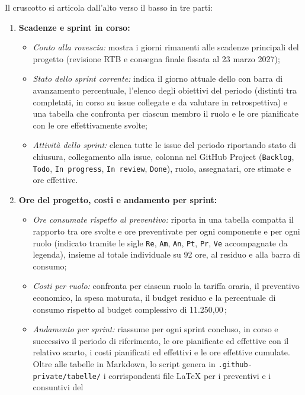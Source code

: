 \documentclass[documento]{gpt}
\begin{document}
	Il cruscotto si articola dall'alto verso il basso in tre parti:
	\begin{enumerate}
		\item \textbf{Scadenze e sprint in corso:}
		\begin{itemize}
			\item \textit{Conto alla rovescia:} mostra i giorni rimanenti alle
			scadenze principali del progetto (revisione RTB e consegna finale
			fissata al 23 marzo 2027);
			\item \textit{Stato dello sprint corrente:} indica il giorno attuale dello
			 con barra di avanzamento percentuale, l'elenco degli
			obiettivi del periodo (distinti tra completati, in corso su issue
			collegate e da valutare in retrospettiva) e una tabella che
			confronta per ciascun membro il ruolo e le ore pianificate con le
			ore effettivamente svolte;
			\item \textit{Attività dello sprint:} elenca tutte le issue del periodo
			riportando stato di chiusura, collegamento alla issue, colonna nel
			GitHub Project (\texttt{Backlog}, \texttt{Todo},
			\texttt{In progress}, \texttt{In review}, \texttt{Done}), ruolo,
			assegnatari, ore stimate e ore effettive.
		\end{itemize}
		\item \textbf{Ore del progetto, costi e andamento per sprint:}
		\begin{itemize}
			\item \textit{Ore consumate rispetto al preventivo:} riporta in una
			tabella compatta il rapporto tra ore svolte e ore preventivate per
			ogni componente e per ogni ruolo (indicato tramite le sigle
			\texttt{Re}, \texttt{Am}, \texttt{An}, \texttt{Pt}, \texttt{Pr},
			\texttt{Ve} accompagnate da legenda), insieme al totale individuale
			su 92 ore, al residuo e alla barra di consumo;
			\item \textit{Costi per ruolo:} confronta per ciascun ruolo la tariffa
			oraria, il preventivo economico, la spesa maturata, il budget
			residuo e la percentuale di consumo rispetto al budget complessivo
			di 11.250,00\,\texteuro;
			\item \textit{Andamento per sprint:} riassume per ogni sprint concluso,
			in corso e successivo il periodo di riferimento, le ore pianificate
			ed effettive con il relativo scarto, i costi pianificati ed
			effettivi e le ore effettive cumulate. Oltre alle tabelle in
			Markdown, lo script genera in \texttt{.github-private/tabelle/} i
			corrispondenti file \LaTeX{} per i preventivi e i consuntivi del

\end{itemize}
\end{enumerate}
\end{document}
